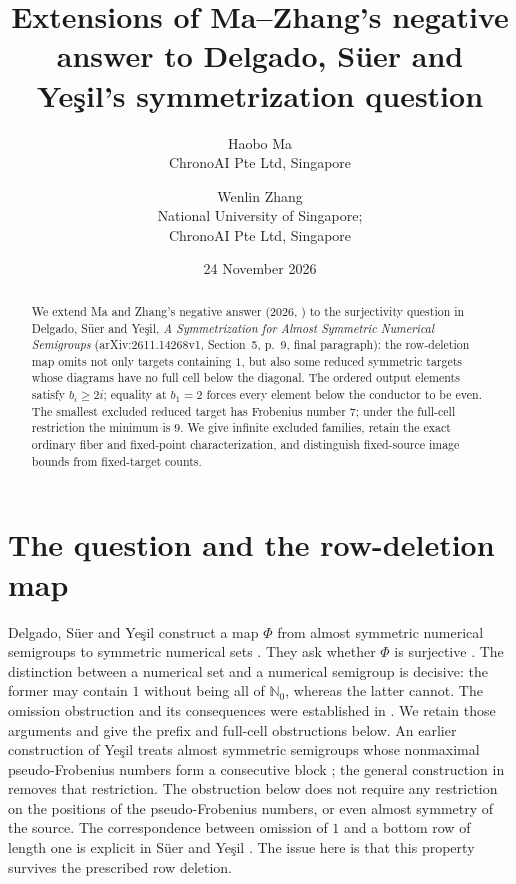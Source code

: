 \documentclass[11pt,a4paper]{article}
\title{Extensions of Ma--Zhang's negative answer to Delgado, S\"uer and Ye\c{s}il's symmetrization question}
\author{Haobo Ma\\\small ChronoAI Pte Ltd, Singapore
\and Wenlin Zhang\\\small National University of Singapore;\\\small ChronoAI Pte Ltd, Singapore}
\date{24 November 2026}
\theoremstyle{definition}
\theoremstyle{remark}
\newcommand{\N}{\mathbb{N}_0}
\begin{document}
\maketitle
\begin{abstract}
We extend Ma and Zhang's negative answer (2026, \cite[Section~2]{MZ}) to
the surjectivity question in Delgado, S\"uer and Ye\c{s}il,
\emph{A Symmetrization for Almost Symmetric Numerical Semigroups}
(arXiv:2611.14268v1, Section~5, p.~9, final paragraph):
the row-deletion map omits not only targets containing $1$, but also
some reduced symmetric targets whose diagrams have no full cell below
the diagonal.
The ordered output elements satisfy $b_i\geq2i$; equality at $b_1=2$
forces every element below the conductor to be even.
The smallest excluded reduced target has Frobenius number $7$;
under the full-cell restriction the minimum is $9$.
We give infinite excluded families, retain the exact ordinary fiber and
fixed-point characterization, and distinguish fixed-source image bounds
from fixed-target counts.
\end{abstract}

\section{The question and the row-deletion map}
Delgado, S\"uer and Ye\c{s}il construct a map $\Phi$ from almost symmetric
numerical semigroups to symmetric numerical sets \cite[Theorem~4.2]{DSY}.
They ask whether $\Phi$ is surjective \cite[Section~5, p.~9, final paragraph]{DSY}.
The distinction between a numerical set and a numerical semigroup is decisive:
the former may contain $1$ without being all of $\N$, whereas the latter cannot.
The omission obstruction and its consequences were established in \cite[Section~2]{MZ}. We retain those arguments and give the prefix and full-cell obstructions below.
An earlier construction of Ye\c{s}il treats almost symmetric semigroups whose
nonmaximal pseudo-Frobenius numbers form a consecutive block
\cite[Lemma~5.7]{Y}; the general construction in \cite[Theorem~4.2]{DSY}
removes that restriction. The obstruction below does not require any
restriction on the positions of the pseudo-Frobenius numbers, or even
almost symmetry of the source.
The correspondence between omission of $1$ and a bottom row of length one
is explicit in S\"uer and Ye\c{s}il \cite[Proposition~3.5 and Corollary~3.6]{SY}.
The issue here is that this property survives the prescribed row deletion.
\end{document}
